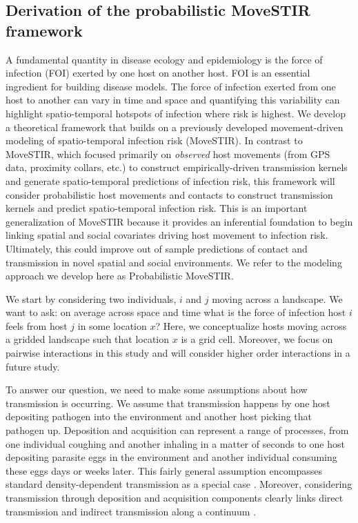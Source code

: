\documentclass[letterpaper]{article}
\begin{document}
\subsection*{Derivation of the probabilistic MoveSTIR framework}

A fundamental quantity in disease ecology and epidemiology is the force of infection (FOI) exerted by one host on another host. FOI is an essential ingredient for building disease models.  The force of infection exerted from one host to another can vary in time and space and quantifying this variability can highlight spatio-temporal hotspots of infection where risk is highest.  We develop a theoretical framework that builds on a previously developed movement-driven modeling of spatio-temporal infection risk (MoveSTIR).  In contrast to MoveSTIR, which focused primarily on \emph{observed} host movements (from GPS data, proximity collars, etc.) to construct empirically-driven transmission kernels and generate spatio-temporal predictions of infection risk, this framework will consider probabilistic host movements and contacts to construct transmission kernels and predict spatio-temporal infection risk. This is an important generalization of MoveSTIR because it provides an inferential foundation to begin linking spatial and social covariates driving host movement to infection risk.  Ultimately, this could improve out of sample predictions of contact and transmission in novel spatial and social environments.  We refer to the modeling approach we develop here as Probabilistic MoveSTIR.     

We start by considering two individuals, $i$ and $j$ moving across a landscape.  We want to ask: on average across space and time what is the force of infection host $i$ feels from host $j$ in some location $x$? Here, we conceptualize hosts moving across a gridded landscape such that location $x$ is a grid cell.  Moreover, we focus on pairwise interactions in this study and will consider higher order interactions in a future study.   

To answer our question, we need to make some assumptions about how transmission is occurring.  We assume that transmission happens by one host depositing pathogen into the environment and another host picking that pathogen up.  Deposition and acquisition can represent a range of processes, from one individual coughing and another inhaling in a matter of seconds to one host depositing parasite eggs in the environment and another individual consuming these eggs days or weeks later.  This fairly general assumption encompasses standard density-dependent transmission as a special case \citep{Cortez2021}.  Moreover, considering transmission through deposition and acquisition components clearly links direct transmission and indirect transmission along a continuum \citep{Wilber2022}.  
\end{document}
